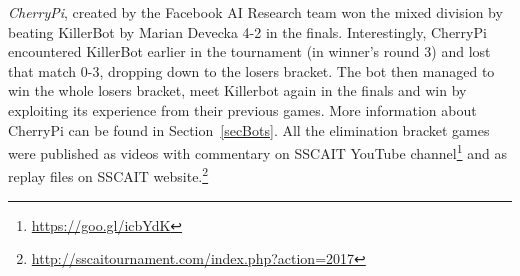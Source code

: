 {\em CherryPi}, created by the Facebook AI Research team won the mixed division by beating KillerBot by Marian Devecka 4-2 in the finals. Interestingly, CherryPi encountered KillerBot earlier in the tournament (in winner's round 3) and lost that match 0-3, dropping down to the losers bracket. The bot then managed to win the whole losers bracket, meet Killerbot again in the finals and win by exploiting its experience from their previous games. More information about CherryPi can be found in Section~\ref{secBots}.
All the elimination bracket games were published as videos with commentary on SSCAIT YouTube channel\footnote{\url{https://goo.gl/icbYdK}} and as replay files on SSCAIT website.\footnote{\url{http://sscaitournament.com/index.php?action=2017}} 




